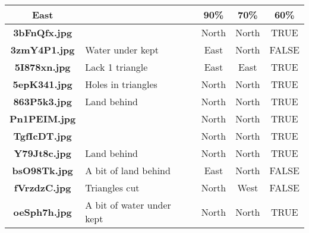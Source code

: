 \documentclass{article}
\begin{document}
\begin{table}[h!]
{\begin{tabular}{|c|p{4cm}|c|c|c|}
            \textbf{East}        &                              & 90\%                          & 70\%                             & 60\%                 \\ \hline
            \rowcolor{gray!0}
            \textbf{3bFnQfx.jpg} &                              & North                         & North                            & TRUE                 \\ \hline
            \rowcolor{gray!10}
            \textbf{3zmY4P1.jpg} & Water under kept             & East                          & North                            & FALSE                \\ \hline
            \rowcolor{gray!0}
            \textbf{5I878xn.jpg} & Lack 1 triangle              & East                          & East                             & TRUE                 \\ \hline
            \rowcolor{gray!10}
            \textbf{5epK341.jpg} & Holes in triangles           & North                         & North                            & TRUE                 \\ \hline
            \rowcolor{gray!0}
            \textbf{863P5k3.jpg} & Land behind                  & North                         & North                            & TRUE                 \\ \hline
            \rowcolor{gray!10}
            \textbf{Pn1PEIM.jpg} &                              & North                         & North                            & TRUE                 \\ \hline
            \rowcolor{gray!0}
            \textbf{TgfIcDT.jpg} &                              & North                         & North                            & TRUE                 \\ \hline
            \rowcolor{gray!10}
            \textbf{Y79Jt8c.jpg} & Land behind                  & North                         & North                            & TRUE                 \\ \hline
            \rowcolor{gray!0}
            \textbf{bsO98Tk.jpg} & A bit of land behind         & East                          & North                            & FALSE                \\ \hline
            \rowcolor{gray!10}
            \textbf{fVrzdzC.jpg} & Triangles cut                & North                         & West                             & FALSE                \\ \hline
            \rowcolor{gray!0}
            \textbf{oeSph7h.jpg} & A bit of water under kept    & North                         & North                            & TRUE                 \\ \hline

\end{tabular}}
\end{table}
\end{document}
